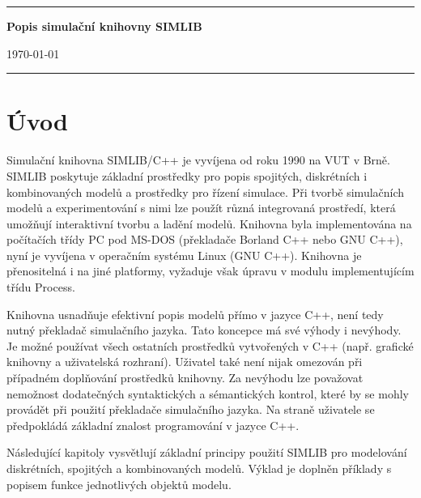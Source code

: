 \documentclass[a4paper]{article}
\begin{document}
\begin{titlepage}
\hrule
\vfill
\begin{center}

            {\Huge\bf Popis simulační knihovny SIMLIB\\}


\bigskip                    \today

\end{center}
\vfill
\hrule
\end{titlepage}

\pagebreak

\tableofcontents

\pagebreak

\section{Úvod}

Simulační knihovna SIMLIB/C++ je vyvíjena od roku 1990 na VUT v Brně.
SIMLIB poskytuje základní prostředky pro popis spojitých, diskrétních i
kombinovaných modelů a prostředky pro řízení simulace. Při tvorbě simulačních
modelů a experimentování s nimi lze použít různá integrovaná prostředí, která
umožňují interaktivní tvorbu a ladění modelů.
Knihovna byla implementována na počítačích třídy PC pod MS-DOS (překladače
Borland C++ nebo GNU C++), nyní je vyvíjena v operačním systému Linux (GNU
C++). Knihovna je přenositelná i na jiné platformy, vyžaduje však úpravu v
modulu implementujícím třídu Process.

Knihovna usnadňuje efektivní popis modelů přímo v jazyce C++,
není tedy nutný překladač simulačního jazyka. Tato koncepce má
své výhody i nevýhody. Je možné používat všech ostatních
prostředků vytvořených v C++ (např. grafické knihovny
a uživatelská rozhraní). Uživatel také není nijak omezován při
případném doplňování prostředků knihovny. Za nevýhodu lze
považovat nemožnost dodatečných syntaktických a sémantických
kontrol, které by se mohly provádět při použití překladače
simulačního jazyka. Na straně uživatele se předpokládá základní
znalost programování v jazyce C++.

Následující kapitoly vysvětlují základní principy použití SIMLIB pro
modelování diskrétních, spojitých a kombinovaných modelů. Výklad
je doplněn příklady s popisem funkce jednotlivých objektů
modelu.
\end{document}
